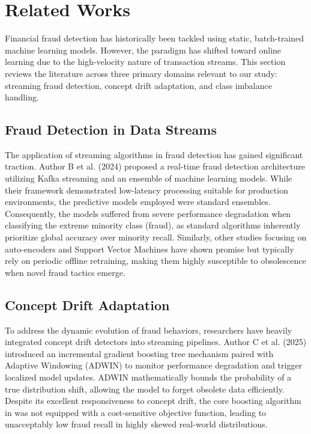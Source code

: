 \section{Related Works}
\label{sec:related_works}

Financial fraud detection has historically been tackled using static, batch-trained machine learning models. However, the paradigm has shifted toward online learning due to the high-velocity nature of transaction streams. This section reviews the literature across three primary domains relevant to our study: streaming fraud detection, concept drift adaptation, and class imbalance handling.

\subsection{Fraud Detection in Data Streams}
The application of streaming algorithms in fraud detection has gained significant traction. Author B et al. (2024) \cite{ref_b} proposed a real-time fraud detection architecture utilizing Kafka streaming and an ensemble of machine learning models. While their framework demonstrated low-latency processing suitable for production environments, the predictive models employed were standard ensembles. Consequently, the models suffered from severe performance degradation when classifying the extreme minority class (fraud), as standard algorithms inherently prioritize global accuracy over minority recall. Similarly, other studies focusing on auto-encoders and Support Vector Machines \cite{ref_a} have shown promise but typically rely on periodic offline retraining, making them highly susceptible to obsolescence when novel fraud tactics emerge.

\subsection{Concept Drift Adaptation}
To address the dynamic evolution of fraud behaviors, researchers have heavily integrated concept drift detectors into streaming pipelines. Author C et al. (2025) \cite{ref_c} introduced an incremental gradient boosting tree mechanism paired with Adaptive Windowing (ADWIN) to monitor performance degradation and trigger localized model updates. ADWIN mathematically bounds the probability of a true distribution shift, allowing the model to forget obsolete data efficiently. Despite its excellent responsiveness to concept drift, the core boosting algorithm in \cite{ref_c} was not equipped with a cost-sensitive objective function, leading to unacceptably low fraud recall in highly skewed real-world distributions.

